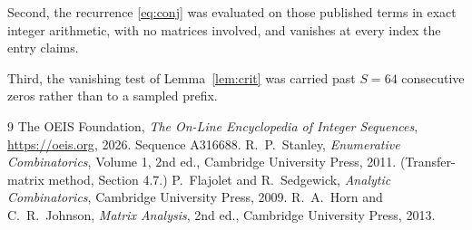 \documentclass[11pt,a4paper]{article}
\theoremstyle{plain}
\theoremstyle{definition}
\begin{document}
Second, the recurrence \eqref{eq:conj} was evaluated on those published terms in exact
integer arithmetic, with no matrices involved, and vanishes at every index the entry claims.

Third, the vanishing test of Lemma~\ref{lem:crit} was carried past $S=64$ consecutive
zeros rather than to a sampled prefix.

\begin{thebibliography}{9}
 The OEIS Foundation, \emph{The On-Line Encyclopedia of Integer
Sequences}, \url{https://oeis.org}, 2026. Sequence A316688.
 R.~P.~Stanley, \emph{Enumerative Combinatorics}, Volume 1, 2nd ed.,
Cambridge University Press, 2011. (Transfer-matrix method, Section 4.7.)
 P.~Flajolet and R.~Sedgewick, \emph{Analytic Combinatorics}, Cambridge
University Press, 2009.
 R.~A.~Horn and C.~R.~Johnson, \emph{Matrix Analysis}, 2nd ed., Cambridge
University Press, 2013.
\end{thebibliography}
\end{document}
